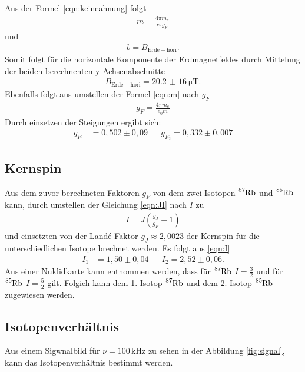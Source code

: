Aus der Formel \eqref{eqn:keineahnung} folgt
\begin{align}
m=\frac{4\pi m_e}{e_0 g_F} \label{eqn:m}
\end{align}
und
\begin{align*}
b=B_\mathrm{Erde-hori}.
\end{align*}
Somit folgt für die horizontale Komponente der Erdmagnetfeldes durch Mittelung der
beiden berechnenten y-Achsenabschnitte
\begin{align*}
B_\mathrm{Erde-hori}=\SI{20,2(16)}{\micro\tesla}.
\end{align*}
Ebenfalls folgt aus umstellen der Formel \eqref{eqn:m} nach $g_F$
\begin{align}
  g_F=\frac{4\pi m_e}{e_0 m} \label{eqn:g_f}
\end{align}
Durch einsetzen der Steigungen ergibt sich:
\begin{align*}
  g_{F_1} & =0,502\pm0,09 &  & g_{F_2}=0,332\pm0,007
\end{align*}

\subsection{Kernspin}
Aus dem zuvor berechneten Faktoren $g_F$ von dem zwei Isotopen $\ce{^{87}Rb}$ und $\ce{^{85}Rb}$ kann,
durch umstellen der Gleichung \eqref{eqn:JI}
nach $I$ zu
\begin{align}
  I=J\left( \frac{g_J}{g_F}-1\right) \label{eqn:I}
\end{align}
und einsetzten von der Landé-Faktor $g_J\approx2,0023$ der Kernspin für die
unterschiedlichen Isotope brechnet werden.
Es folgt aus \eqref{eqn:I}
\begin{align*}
  I_1&=1,50\pm0,04&   &I_2=2,52\pm0,06.
\end{align*}
Aus einer Nuklidkarte \cite{verhalt} kann entnommen werden, dass für
$\ce{^{87}Rb}$ $I=\frac{3}{2}$
und  für $\ce{^{85}Rb}$ $I=\frac{5}{2}$ gilt.
Folgich kann dem 1. Isotop $\ce{^{87}Rb}$ und dem  2. Isotop $\ce{^{85}Rb}$
zugewiesen werden.
\subsection{Isotopenverhältnis}
Aus einem Sigwnalbild für $\nu=100\,\si{\kilo\hertz}$
zu sehen in der Abbildung \ref{fig:signal},
kann das Isotopenverhältnis bestimmt werden.

